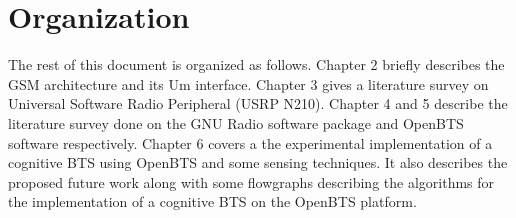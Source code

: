 \section{Organization}
The rest of this document is organized as follows. Chapter 2 briefly describes
the GSM architecture and its Um interface. Chapter 3 gives a literature survey
on Universal Software Radio Peripheral (USRP N210). Chapter 4 and 5 describe 
the literature survey done on the GNU Radio software package and OpenBTS 
software respectively. Chapter 6 covers a the experimental implementation of a
cognitive BTS using OpenBTS and some sensing techniques. It also describes the
proposed future work along with some flowgraphs describing the algorithms for 
the implementation of a cognitive BTS on the OpenBTS platform.

